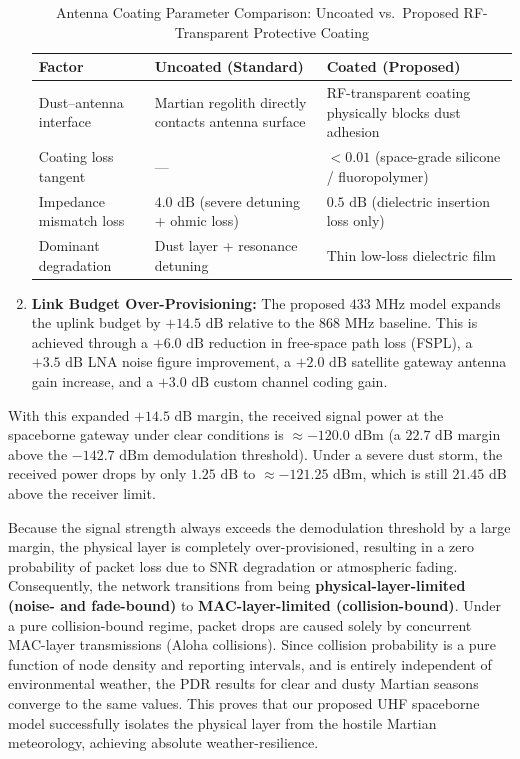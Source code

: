 \documentclass{ijuc}
\begin{document}
\begin{enumerate}
\begin{table}
\renewcommand{\arraystretch}{1.3}
\caption{Antenna Coating Parameter Comparison: Uncoated vs.\ Proposed RF-Transparent Protective Coating}
\label{tab:coating}
\centering
\begin{tabular}{p{2.8cm}|p{3.2cm}|p{3.2cm}}
\hline
\textbf{Factor} & \textbf{Uncoated (Standard)} & \textbf{Coated (Proposed)} \\
\hline
Dust--antenna interface & Martian regolith directly contacts antenna surface & RF-transparent coating physically blocks dust adhesion \\
\hline
Coating loss tangent & — & $< 0.01$ (space-grade silicone / fluoropolymer) \\
\hline
Impedance mismatch loss & $4.0\text{ dB}$ (severe detuning + ohmic loss) & $0.5\text{ dB}$ (dielectric insertion loss only) \\
\hline
Dominant degradation & Dust layer + resonance detuning & Thin low-loss dielectric film \\
\hline
\end{tabular}
\end{table}
    \item \textbf{Link Budget Over-Provisioning:} The proposed $433\text{ MHz}$ model expands the uplink budget by $+14.5\text{ dB}$ relative to the $868\text{ MHz}$ baseline. This is achieved through a $+6.0\text{ dB}$ reduction in free-space path loss (FSPL), a $+3.5\text{ dB}$ LNA noise figure improvement, a $+2.0\text{ dB}$ satellite gateway antenna gain increase, and a $+3.0\text{ dB}$ custom channel coding gain.
\end{enumerate}

With this expanded $+14.5\text{ dB}$ margin, the received signal power at the spaceborne gateway under clear conditions is $\approx -120.0\text{ dBm}$ (a $22.7\text{ dB}$ margin above the $-142.7\text{ dBm}$ demodulation threshold). Under a severe dust storm, the received power drops by only $1.25\text{ dB}$ to $\approx -121.25\text{ dBm}$, which is still $21.45\text{ dB}$ above the receiver limit. 

Because the signal strength always exceeds the demodulation threshold by a large margin, the physical layer is completely over-provisioned, resulting in a zero probability of packet loss due to SNR degradation or atmospheric fading. Consequently, the network transitions from being \textbf{physical-layer-limited (noise- and fade-bound)} to \textbf{MAC-layer-limited (collision-bound)}. Under a pure collision-bound regime, packet drops are caused solely by concurrent MAC-layer transmissions (Aloha collisions). Since collision probability is a pure function of node density and reporting intervals, and is entirely independent of environmental weather, the PDR results for clear and dusty Martian seasons converge to the same values. This proves that our proposed UHF spaceborne model successfully isolates the physical layer from the hostile Martian meteorology, achieving absolute weather-resilience.
\end{document}
